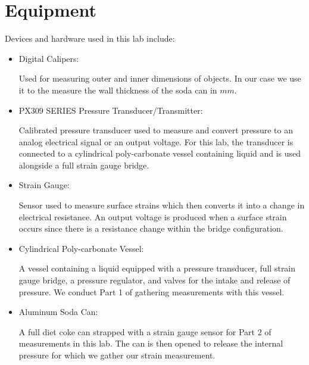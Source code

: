\documentclass{article}
\begin{document}
\section{Equipment}
Devices and hardware used in this lab include:
\begin{itemize}

\item Digital Calipers: 
\vspace{1mm}

Used for measuring outer and inner dimensions of objects. In our case we use it to the measure the wall thickness of the soda can in $mm$.
\vspace{2.5mm}

\item PX309 SERIES Pressure Transducer/Transmitter:
\vspace{1mm}

Calibrated pressure transducer used to measure and convert pressure to an analog electrical signal or an output voltage. For this lab, the transducer is connected to a cylindrical poly-carbonate vessel containing liquid and is used alongside a full strain gauge bridge.
\vspace{2.5mm}

\item Strain Gauge: 
\vspace{1mm}

Sensor used to measure surface strains which then converts it into a change in electrical resistance. An output voltage is produced when a surface strain occurs since there is a resistance change within the bridge configuration. 
\vspace{2.5mm}

\item Cylindrical Poly-carbonate Vessel: 
\vspace{1mm}

A vessel containing a liquid equipped with a pressure transducer, full strain gauge bridge, a pressure regulator, and valves for the intake and release of pressure. We conduct Part 1 of gathering measurements with this vessel.
\vspace{2.5mm}

\item Aluminum Soda Can:
\vspace{1mm}

A full diet coke can strapped with a strain gauge sensor for Part 2 of measurements in this lab. The can is then opened to release the internal pressure for which we gather our strain measurement.
\vspace{2.5mm}


\end{itemize}
\end{document}
